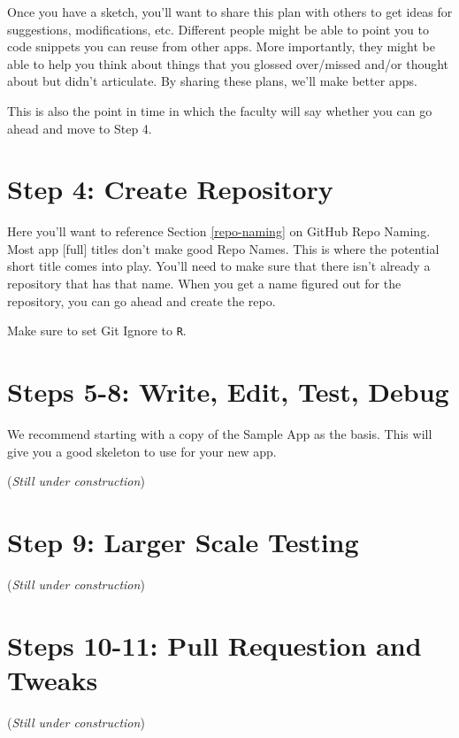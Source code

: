 \documentclass[
]{book}
\begin{document}
Once you have a sketch, you'll want to share this plan with others to get ideas for suggestions, modifications, etc. Different people might be able to point you to code snippets you can reuse from other apps. More importantly, they might be able to help you think about things that you glossed over/missed and/or thought about but didn't articulate. By sharing these plans, we'll make better apps.

This is also the point in time in which the faculty will say whether you can go ahead and move to Step 4.

\hypertarget{step4}{%
\section{Step 4: Create Repository}\label{step4}}

Here you'll want to reference Section \ref{repo-naming} on GitHub Repo Naming. Most app {[}full{]} titles don't make good Repo Names. This is where the potential short title comes into play. You'll need to make sure that there isn't already a repository that has that name. When you get a name figured out for the repository, you can go ahead and create the repo.

Make sure to set Git Ignore to \texttt{R}.

\hypertarget{steps5-8}{%
\section{Steps 5-8: Write, Edit, Test, Debug}\label{steps5-8}}

We recommend starting with a copy of the Sample App as the basis. This will give you a good skeleton to use for your new app.

(\emph{Still under construction})

\hypertarget{step9}{%
\section{Step 9: Larger Scale Testing}\label{step9}}

(\emph{Still under construction})

\hypertarget{steps10-11}{%
\section{Steps 10-11: Pull Requestion and Tweaks}\label{steps10-11}}

(\emph{Still under construction})
\end{document}
